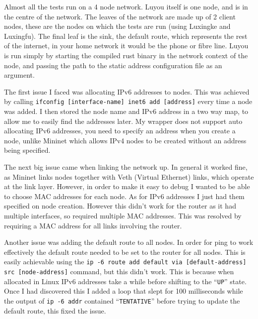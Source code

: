 \documentclass[12pt,a4paper,twoside,openright]{report}
\begin{document}
\bigskip

Almost all the tests run on a 4 node network.  Luyou itself is one node, and is in the centre of the network.  The leaves of the network are made up of 2 client nodes, these are the nodes on which the tests are run (using Luxingke and Luxingfu).  The final leaf is the sink, the default route, which represents the rest of the internet, in your home network it would be the phone or fibre line.  Luyou is run simply by starting the compiled rust binary in the network context of the node, and passing the path to the static address configuration file as an argument.

\bigskip

The first issue I faced was allocating IPv6 addresses to nodes. This was achieved by calling \verb!ifconfig [interface-name] inet6 add [address]! every time a node was added. I then stored the node name and IPv6 address in a two way map, to allow me to easily find the addresses later. My wrapper does not support auto allocating IPv6 addresses, you need to specify an address when you create a node, unlike Mininet which allows IPv4 nodes to be created without an address being specified.

\bigskip

The next big issue came when linking the network up. In general it worked fine, as Mininet links nodes together with Veth (Virtual Ethernet) links, which operate at the link layer.  However, in order to make it easy to debug I wanted to be able to choose MAC addresses for each node. As for IPv6 addresses I just had them specified on node creation.  However this didn't work for the router as it had multiple interfaces, so required multiple MAC addresses. This was resolved by requiring a MAC address for all links involving the router.

\bigskip

Another issue was adding the default route to all nodes.  In order for ping to work effectively the default route needed to be set to the router for all nodes.  This is easily achievable using the \verb!ip -6 route add default via [default-address] src [node-address]! command, but this didn't work.  This is because when allocated in Linux IPv6 addresses take a while before shifting to the ``\verb!UP!'' state.  Once I had discovered this I added a loop that slept for 100 milliseconds while the output of \verb!ip -6 addr! contained ``\verb!TENTATIVE!'' before trying to update the default route, this fixed the issue.

\bigskip
\end{document}
